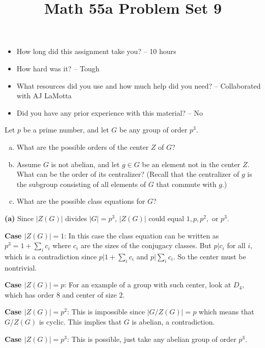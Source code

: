 \documentclass[11pt,letterpaper]{article}
\title{\textbf{Math 55a Problem Set 9}}
\begin{document}
\maketitle
\setcounter{page}{0}
\thispagestyle{empty}

\begin{itemize}
  \item How long did this assignment take you? -- 10 hours
  \item How hard was it? -- Tough
  \item What resources did you use and how much help did you need? -- Collaborated with AJ LaMotta
  \item Did you have any prior experience with this material? -- No
\end{itemize}

\pagebreak
\begin{problem}
Let $p$ be a prime number, and let $G$ be any group of order $p^3$.

\begin{enumerate}[(a)]
  \item What are the possible orders of the center $Z$ of $G$?
  \item Assume $G$ is not abelian, and let $g\in G$ be an element not in the
  center $Z$. What can be the order of its centralizer? (Recall that the
  centralizer of $g$ is the subgroup consisting of all elements of $G$ 
  that commute with $g$.)
  \item What are the possible class equations for $G$? 
\end{enumerate}
\end{problem}

\textbf{(a)} Since $|Z(G)|$ divides $|G|=p^3$, $|Z(G)|$ could equal $1,p,p^2,$ or $p^3$.

\textbf{Case $|Z(G)|=1$}: In this case the class equation can be written as $p^3=1+\sum_i c_i$ where $c_i$ are the sizes of the conjugacy classes. But $p|c_i$ for all $i$, which is a contradiction since $p|1+\sum_i c_i$ and $p|\sum_i c_i$. So the center must be nontrivial.

\textbf{Case $|Z(G)|=p$}: For an example of a group with such center, look at $D_4$, which has order $8$ and center of size $2$.  

\textbf{Case $|Z(G)|=p^2$}: This is impossible since $|G/Z(G)|=p$ which means that $G/Z(G)$ is cyclic. This implies that $G$ is abelian, a contradiction.   

\textbf{Case $|Z(G)|=p^3$}: This is possible, just take any abelian group of order $p^3$. 
\end{document}
